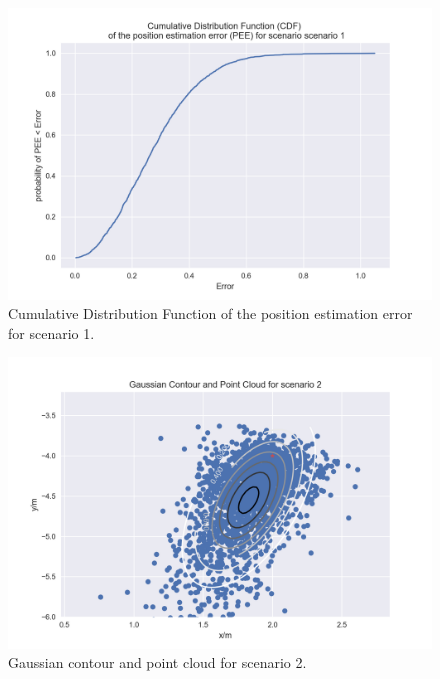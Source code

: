 \begin{figure}[H]
	\centering
\includegraphics[width=14cm]{cdf1.png}
	\caption{Cumulative Distribution Function of the position estimation error for scenario 1.}
	\label{fig1:cdf1}
\end{figure}

\begin{figure}[H]
	\centering
\includegraphics[width=14cm]{gauss2.png}
	\caption{Gaussian contour and point cloud for scenario 2.}
	\label{fig1:gpc2}
\end{figure}

